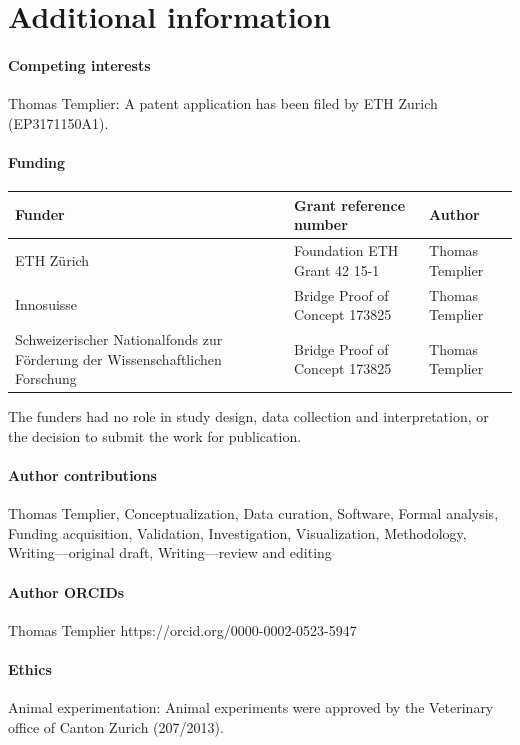\documentclass{article}
\begin{document}
\section*{Additional information}

\paragraph{Competing interests}
Thomas Templier: A patent application has been filed by ETH Zurich (EP3171150A1).

\paragraph{Funding}\leavevmode\par
\noindent\begin{tabular}{@{}p{4.4cm}p{4.0cm}p{3.2cm}@{}}
\toprule
\textbf{Funder} & \textbf{Grant reference number} & \textbf{Author} \\
\midrule
ETH Zürich & Foundation ETH Grant 42 15-1 & Thomas Templier \\
Innosuisse & Bridge Proof of Concept 173825 & Thomas Templier \\
Schweizerischer Nationalfonds zur Förderung der Wissenschaftlichen Forschung & Bridge Proof of Concept 173825 & Thomas Templier \\
\bottomrule
\end{tabular}

\noindent The funders had no role in study design, data collection and interpretation, or the decision to submit the work for publication.

\paragraph{Author contributions}
Thomas Templier, Conceptualization, Data curation, Software, Formal analysis, Funding acquisition, Validation, Investigation, Visualization, Methodology, Writing---original draft, Writing---review and editing

\paragraph{Author ORCIDs}
Thomas Templier https://orcid.org/0000-0002-0523-5947

\paragraph{Ethics}
Animal experimentation: Animal experiments were approved by the Veterinary office of Canton Zurich (207/2013).
\end{document}
